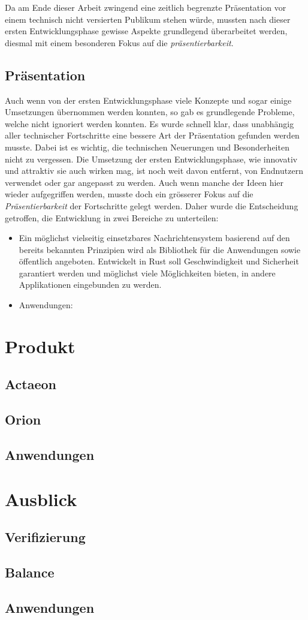 \documentclass[11pt]{article}
\begin{document}
\noindent Da am Ende dieser Arbeit zwingend eine zeitlich begrenzte
Präsentation vor einem technisch nicht versierten Publikum stehen
würde, mussten nach dieser ersten Entwicklungsphase gewisse Aspekte
grundlegend überarbeitet werden, diesmal mit einem besonderen Fokus
auf die \emph{präsentierbarkeit}.  
\subsection{Präsentation}
\label{sec:org8127b00}
Auch wenn von der ersten Entwicklungsphase viele Konzepte und sogar
einige Umsetzungen übernommen werden konnten, so gab es grundlegende
Probleme, welche nicht ignoriert werden konnten. Es wurde schnell
klar, dass unabhängig aller technischer Fortschritte eine bessere Art
der Präsentation gefunden werden musste. Dabei ist es wichtig, die
technischen Neuerungen und Besonderheiten nicht zu vergessen. Die
Umsetzung der ersten Entwicklungsphase, wie innovativ und attraktiv
sie auch wirken mag, ist noch weit davon entfernt, von Endnutzern
verwendet oder gar angepasst zu werden. Auch wenn manche der Ideen
hier wieder aufgegriffen werden, musste doch ein grösserer Fokus auf
die \emph{Präsentierbarkeit} der Fortschritte gelegt werden. Daher wurde die
Entscheidung getroffen, die Entwicklung in zwei Bereiche zu
unterteilen:
\begin{itemize}
\item Ein möglichst vielseitig einsetzbares Nachrichtensystem basierend
auf den bereits bekannten Prinzipien wird als Bibliothek für die
Anwendungen sowie öffentlich angeboten. Entwickelt in Rust soll
Geschwindigkeit und Sicherheit garantiert werden und möglichst viele
Möglichkeiten bieten, in andere Applikationen eingebunden zu werden.
\item Anwendungen:
\end{itemize}
\section{Produkt}
\label{sec:orgbbe78fd}
\subsection{Actaeon}
\label{sec:orgc69a86b}
\subsection{Orion}
\label{sec:orgbafa0c8}
\subsection{Anwendungen}
\label{sec:orge32add0}
\section{Ausblick}
\label{sec:org561b501}
\subsection{Verifizierung}
\label{sec:org86ea52b}
\subsection{Balance}
\label{sec:org9b92a73}
\subsection{Anwendungen}
\label{sec:org016d5ad}
\end{document}
